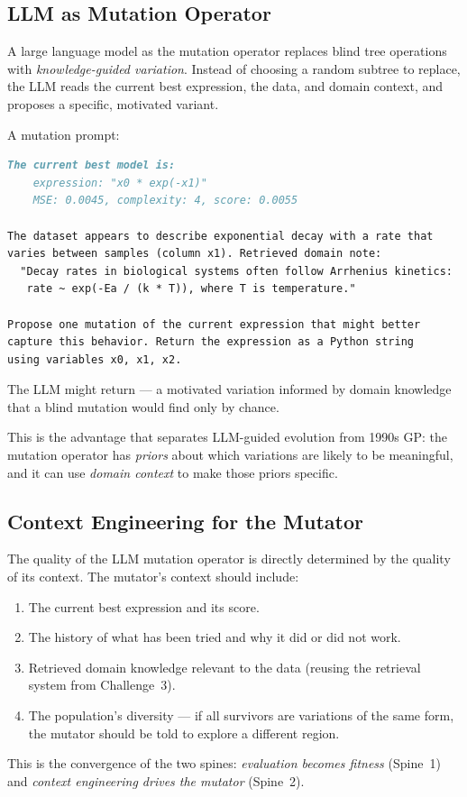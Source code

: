 \subsection{LLM as Mutation Operator}

A large language model as the mutation operator replaces blind tree operations with \emph{knowledge-guided variation}.
Instead of choosing a random subtree to replace, the LLM reads the current best expression, the data, and domain context, and proposes a specific, motivated variant.

\begin{example}
A mutation prompt:
\begin{lstlisting}[language=markdown]
The current best model is:
    expression: "x0 * exp(-x1)"
    MSE: 0.0045, complexity: 4, score: 0.0055

The dataset appears to describe exponential decay with a rate that
varies between samples (column x1). Retrieved domain note:
  "Decay rates in biological systems often follow Arrhenius kinetics:
   rate ~ exp(-Ea / (k * T)), where T is temperature."

Propose one mutation of the current expression that might better
capture this behavior. Return the expression as a Python string
using variables x0, x1, x2.
\end{lstlisting}
The LLM might return  — a motivated variation informed by domain knowledge that a blind mutation would find only by chance.
\end{example}

This is the advantage that separates LLM-guided evolution from 1990s GP: the mutation operator has \emph{priors} about which variations are likely to be meaningful, and it can use \emph{domain context} to make those priors specific.

\subsection{Context Engineering for the Mutator}

The quality of the LLM mutation operator is directly determined by the quality of its context.
The mutator's context should include:
\begin{enumerate}
\item The current best expression and its score.
\item The history of what has been tried and why it did or did not work.
\item Retrieved domain knowledge relevant to the data (reusing the retrieval system from Challenge~3).
\item The population's diversity — if all survivors are variations of the same form, the mutator should be told to explore a different region.
\end{enumerate}
This is the convergence of the two spines: \emph{evaluation becomes fitness} (Spine~1) and \emph{context engineering drives the mutator} (Spine~2).

